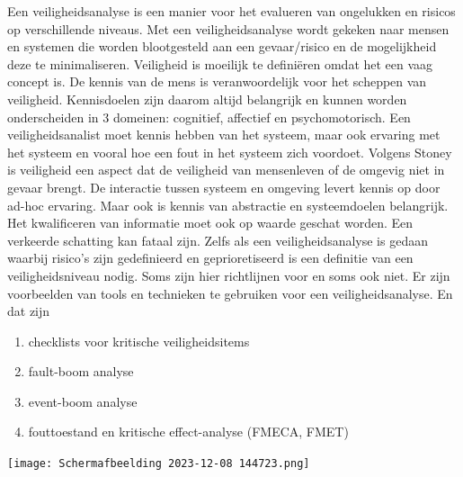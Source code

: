 \documentclass{article}
\begin{document}
	
	Een veiligheidsanalyse is een manier voor het evalueren  van ongelukken en risicos op verschillende niveaus. Met een veiligheidsanalyse wordt gekeken naar mensen en systemen die worden blootgesteld aan een gevaar/risico en de mogelijkheid deze te minimaliseren.
	Veiligheid is moeilijk te definiëren omdat het een vaag concept is.
	De kennis van de mens is veranwoordelijk voor het scheppen van veiligheid.  Kennisdoelen zijn daarom altijd belangrijk en kunnen worden onderscheiden in 3 domeinen: cognitief, affectief en psychomotorisch.\cite{winceckCriticalToSafety}
	Een veiligheidsanalist  moet kennis hebben van het systeem, maar ook ervaring met het systeem en vooral hoe een fout in het systeem zich voordoet.
	Volgens Stoney\cite{chambersHazardAnalysisSCS} is veiligheid een aspect dat de veiligheid van mensenleven  of de omgevig niet in gevaar brengt.
	De interactie tussen systeem en omgeving levert kennis op door ad-hoc ervaring. Maar ook is kennis van abstractie en systeemdoelen belangrijk.
	Het kwalificeren van informatie moet ook op waarde geschat worden. Een verkeerde schatting kan fataal zijn. Zelfs als een veiligheidsanalyse  is gedaan waarbij risico's zijn gedefinieerd en geprioretiseerd is een definitie van een veiligheidsniveau nodig. Soms zijn hier richtlijnen voor en soms ook niet.
	Er zijn voorbeelden van tools en technieken te gebruiken voor een veiligheidsanalyse. En dat zijn
	\begin{enumerate}
		\item checklists voor kritische veiligheidsitems
		\item fault-boom analyse
		\item event-boom analyse
		\item fouttoestand en kritische effect-analyse (FMECA, FMET)
	\end{enumerate}
	
	\cite{rslater1998SCSAnalysis}
	
	\texttt{[image: Schermafbeelding 2023-12-08 144723.png]}
	
\end{document}
